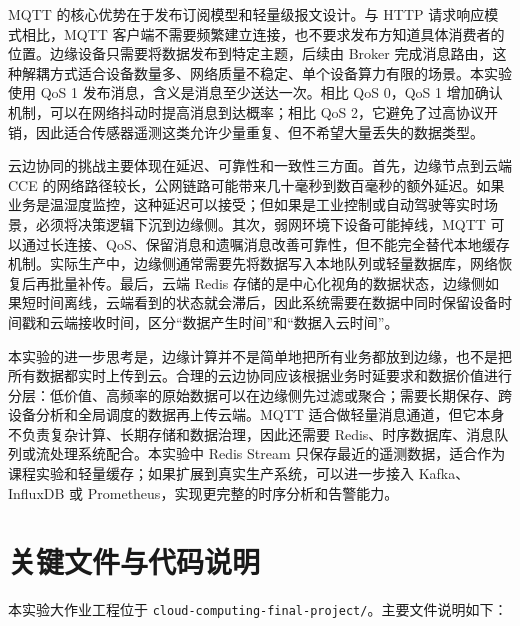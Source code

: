\documentclass[bwprint]{report}
\begin{document}
MQTT 的核心优势在于发布订阅模型和轻量级报文设计。与 HTTP 请求响应模式相比，MQTT 客户端不需要频繁建立连接，也不要求发布方知道具体消费者的位置。边缘设备只需要将数据发布到特定主题，后续由 Broker 完成消息路由，这种解耦方式适合设备数量多、网络质量不稳定、单个设备算力有限的场景。本实验使用 QoS 1 发布消息，含义是消息至少送达一次。相比 QoS 0，QoS 1 增加确认机制，可以在网络抖动时提高消息到达概率；相比 QoS 2，它避免了过高协议开销，因此适合传感器遥测这类允许少量重复、但不希望大量丢失的数据类型。

云边协同的挑战主要体现在延迟、可靠性和一致性三方面。首先，边缘节点到云端 CCE 的网络路径较长，公网链路可能带来几十毫秒到数百毫秒的额外延迟。如果业务是温湿度监控，这种延迟可以接受；但如果是工业控制或自动驾驶等实时场景，必须将决策逻辑下沉到边缘侧。其次，弱网环境下设备可能掉线，MQTT 可以通过长连接、QoS、保留消息和遗嘱消息改善可靠性，但不能完全替代本地缓存机制。实际生产中，边缘侧通常需要先将数据写入本地队列或轻量数据库，网络恢复后再批量补传。最后，云端 Redis 存储的是中心化视角的数据状态，边缘侧如果短时间离线，云端看到的状态就会滞后，因此系统需要在数据中同时保留设备时间戳和云端接收时间，区分“数据产生时间”和“数据入云时间”。

本实验的进一步思考是，边缘计算并不是简单地把所有业务都放到边缘，也不是把所有数据都实时上传到云。合理的云边协同应该根据业务时延要求和数据价值进行分层：低价值、高频率的原始数据可以在边缘侧先过滤或聚合；需要长期保存、跨设备分析和全局调度的数据再上传云端。MQTT 适合做轻量消息通道，但它本身不负责复杂计算、长期存储和数据治理，因此还需要 Redis、时序数据库、消息队列或流处理系统配合。本实验中 Redis Stream 只保存最近的遥测数据，适合作为课程实验和轻量缓存；如果扩展到真实生产系统，可以进一步接入 Kafka、InfluxDB 或 Prometheus，实现更完整的时序分析和告警能力。

\section{关键文件与代码说明}

本实验大作业工程位于 \texttt{cloud-computing-final-project/}。主要文件说明如下：
\end{document}
